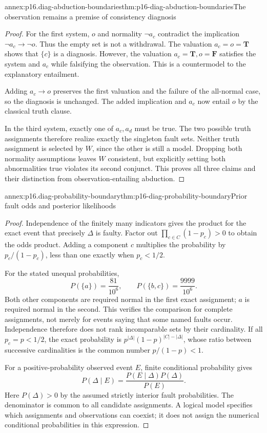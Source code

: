 \begin{annexitem}{annex:p16.diag-abduction-boundaries}{thm:p16-diag-abduction-boundaries}{The observation remains a premise of consistency diagnosis}
\begin{proof}
For the first system, \(o\) and normality
\(\neg a_c\) contradict the implication
\(\neg a_c\to\neg o\). Thus the empty set
is not a withdrawal. The valuation
\(a_c=o=\mathbf T\) shows that \(\{c\}\)
is a diagnosis. However, the valuation
\(a_c=\mathbf T,o=\mathbf F\) satisfies
the system and \(a_c\) while falsifying
the observation. This is a countermodel
to the explanatory entailment.

Adding \(a_c\to o\) preserves the first
valuation and the failure of the all-normal
case, so the diagnosis is unchanged.
The added implication and \(a_c\) now
entail \(o\) by the classical truth clause.

In the third system, exactly one of
\(a_c,a_d\) must be true. The two possible
truth assignments therefore realize exactly
the singleton fault sets. Neither truth
assignment is selected by \(W\), since the
other is still a model. Dropping both
normality assumptions leaves \(W\) consistent,
but explicitly setting both abnormalities
true violates its second conjunct.
This proves all three claims and their
distinction from observation-entailing abduction.
\end{proof}
\end{annexitem}

\begin{annexitem}{annex:p16.diag-probability-boundary}{thm:p16-diag-probability-boundary}{Prior fault odds and posterior likelihoods}
\begin{proof}
Independence of the finitely many indicators
gives the product for the exact event that
precisely \(\Delta\) is faulty. Factor out
\(\prod_{c\in C}(1-p_c)>0\) to obtain the
odds product. Adding a component \(c\)
multiplies the probability by
\(p_c/(1-p_c)\), less than one exactly
when \(p_c<1/2\).

For the stated unequal probabilities,
\[
 P(\{a\})=\frac{81}{10^6},
       \qquad P(\{b,c\})=\frac{9999}{10^6}.
\]
Both other components are required normal
in the first exact assignment; \(a\) is
required normal in the second. This verifies
the comparison for complete assignments,
not merely for events saying that some
named faults occur. Independence therefore
does not rank incomparable sets by their
cardinality. If all \(p_c=p<1/2\),
the exact probability is
\(p^{|\Delta|}(1-p)^{|C|-|\Delta|}\),
whose ratio between successive cardinalities
is the common number \(p/(1-p)<1\).

For a positive-probability observed event
\(E\), finite conditional probability gives
\[
 P(\Delta\mid E)=
       \frac{P(E\mid\Delta)P(\Delta)}{P(E)}.
\]
Here \(P(\Delta)>0\) by the assumed
strictly interior fault probabilities.
The denominator is common to all candidate
assignments. A logical model specifies
which assignments and observations can
coexist; it does not assign the numerical
conditional probabilities in this expression.
\end{proof}
\end{annexitem}
